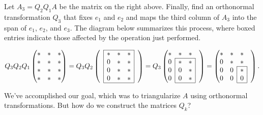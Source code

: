 Let $A_3 = Q_2Q_1A$ be the matrix on the right above. 
Finally, find an orthonormal transformation $Q_3$ that fixes $e_1$ and $e_2$ and maps the third column of $A_3$ into the span of $e_1$, $e_2$, and $e_3$. 
The diagram below summarizes this process, where boxed entries indicate those affected by the operation just performed.

\begin{equation*}
Q_3 Q_2 Q_1
\begin{pmatrix}
* & * & * \\
* & * & * \\
* & * & * \\
* & * & *
\end{pmatrix}
= Q_3 Q_2
\begin{pmatrix}  \cline{2-4}
&\lc{*} & * & \mc{*} & \\
&\lc{0} & * & \mc{*}& \\
&\lc{0} & * & \mc{*} & \\
&\lc{0}& * & \mc{*} & \\ \cline{2-4}
\end{pmatrix}
= Q_3
\begin{pmatrix}
* & * & * \\ \cline{2-3}
\mc{0} & * & \mc{*} \\
\mc{0} & 0 & \mc{*} \\
\mc{0} & 0 & \mc{*} & \\ \cline{2-3}
\end{pmatrix}
=
\begin{pmatrix}
* & * & * \\
0 & * & * \\ \cline{3-3}
0 & \mc{0} & \mc{*} \\
0 & \mc{0} & \mc{0} & \\ \cline{3-3}
\end{pmatrix}.
\end{equation*}

We've accomplished our goal, which was to triangularize $A$ using orthonormal transformations.
But how do we construct the matrices $Q_k$?

